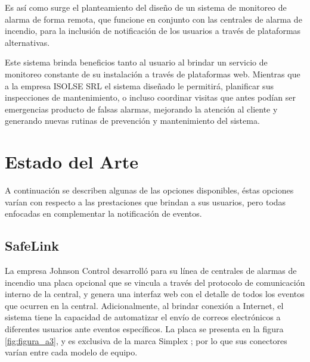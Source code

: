 Es así como surge el planteamiento del diseño de un sistema de monitoreo de alarma de forma remota, que funcione en conjunto con las centrales de alarma de incendio, para la  inclusión de notificación de los usuarios a través de plataformas alternativas.

Este sistema brinda beneficios tanto al usuario al brindar un servicio de monitoreo constante de su instalación a través de plataformas web.  Mientras que a la empresa ISOLSE SRL el sistema diseñado le permitirá, planificar sus inspecciones de mantenimiento, o incluso coordinar visitas que antes podían ser emergencias producto de falsas alarmas, mejorando la atención al cliente y generando nuevas rutinas de prevención y mantenimiento del sistema.


\section{Estado del Arte}

A continuación se describen algunas de las opciones disponibles, éstas opciones varían con respecto a las prestaciones que brindan a sus usuarios, pero todas enfocadas en complementar la notificación de eventos. 

\subsection{SafeLink}

La empresa Johnson Control desarrolló para su línea de centrales de alarmas de incendio una placa opcional que se vincula a través del protocolo de comunicación interno de la central, y genera una interfaz web con el detalle de todos los eventos que ocurren en la central. Adicionalmente, al brindar conexión a Internet, el sistema tiene la capacidad de automatizar el envío de correos electrónicos a diferentes usuarios ante eventos específicos. La placa se presenta en la figura \ref{fig:figura_a3}, y es exclusiva de la marca Simplex \cite{safelink}; por lo que sus conectores varían entre cada modelo de equipo.

